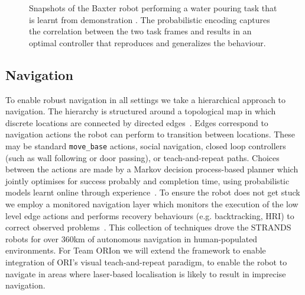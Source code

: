 \documentclass[runningheads,a4paper]{llncs}
\newcommand{\teamori}{Team ORIon}
\begin{document}
\begin{figure}[!tbh]
	\centering
	\caption{Snapshots of the Baxter robot performing a water pouring task that
	is learnt from demonstration \cite{Zeestraten2017-RAL}. The probabilistic
	encoding captures the correlation between the two task frames and results
	in an optimal controller that reproduces and generalizes the behaviour.}
	\label{fig:baxter_water_task}
\end{figure}

\subsection{Navigation}

To enable robust navigation in all settings we take a hierarchical approach to navigation. The hierarchy is structured around a topological map in which discrete locations are connected by directed edges~\cite{jpulido2015NowOrLater}. Edges correspond to navigation actions the robot can perform to transition between locations. These may be standard \texttt{move\_base} actions, social navigation, closed loop controllers (such as wall following or door passing), or teach-and-repeat paths. Choices between the actions are made by a Markov decision process-based planner which jointly optimises for success probably and completion time, using probabilistic models learnt online through experience~\cite{LPH14b}. To ensure the robot does not get stuck we employ a monitored navigation layer which monitors the execution of the low level edge actions and performs recovery behaviours (e.g. backtracking, HRI) to correct observed problems~\cite{strands@ram}. This collection of techniques drove the STRANDS robots for over 360km of autonomous navigation in human-populated environments. For \teamori{} we will extend the framework to enable integration of ORI's visual teach-and-repeat paradigm, to enable the robot to navigate in areas where laser-based localisation is likely to result in imprecise navigation. 
\end{document}
